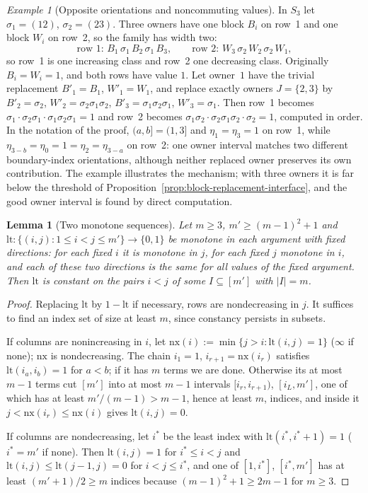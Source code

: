 \documentclass[11pt]{article}
\numberwithin{equation}{section}
\theoremstyle{plain}
\newtheorem{lemma}[theorem]{Lemma}
\theoremstyle{definition}
\theoremstyle{remark}
\newtheorem{example}[theorem]{Example}
\theoremstyle{plain}
\begin{document}
\begin{example}[Opposite orientations and noncommuting values]
\label{ex:nonabelian-reverse-owner}
In $S_3$ let $\sigma_1=(12)$, $\sigma_2=(23)$.  Three owners have one block $B_i$ on
row~1 and one block $W_i$ on row~2, so the family has width two:
\[
 \text{row 1: }B_1\,\sigma_1\,B_2\,\sigma_1\,B_3,\qquad
 \text{row 2: }W_3\,\sigma_2\,W_2\,\sigma_2\,W_1,
\]
so row~1 is one increasing class and row~2 one decreasing class.  Originally
$B_i=W_i=1$, and both rows have value $1$.  Let owner~$1$ have the
trivial replacement $B'_1=B_1$, $W'_1=W_1$, and replace exactly owners
$J=\{2,3\}$ by $B'_2=\sigma_2$, $W'_2=\sigma_2\sigma_1\sigma_2$, $B'_3=\sigma_1\sigma_2\sigma_1$,
$W'_3=\sigma_1$.  Then row~1 becomes
$\sigma_1\cdot\sigma_2\sigma_1\cdot\sigma_1\sigma_2\sigma_1=1$ and row~2 becomes
$\sigma_1\sigma_2\cdot\sigma_2\sigma_1\sigma_2\cdot\sigma_2=1$, computed in order.  In the notation
of the proof, $(a,b]=(1,3]$ and $\eta_1=\eta_3=1$ on row~1, while
$\eta_{3-b}=\eta_0=1=\eta_2=\eta_{3-a}$ on row~2: one owner interval matches
two different boundary-index orientations, although neither replaced owner
preserves its own contribution.  The example illustrates the mechanism; with
three owners it is far below the threshold of Proposition~\ref{prop:block-replacement-interface},
and the good owner interval is found by direct computation.
\end{example}

\begin{lemma}[Two monotone sequences]
\label{lem:two-sequence}
Let $m\ge3$, $m'\ge(m-1)^2+1$ and $\mathrm{lt}:\{(i,j):1\le i<j\le m'\}\to\{0,1\}$
be monotone in each argument with fixed directions: for each fixed $i$ it is
monotone in $j$, for each fixed $j$ monotone in $i$, and each of these two
directions is the same for all values of the fixed argument.  Then $\mathrm{lt}$ is
constant on the pairs $i<j$ of some $I\subseteq[m']$ with $|I|=m$.
\end{lemma}

\begin{proof}
Replacing $\mathrm{lt}$ by $1-\mathrm{lt}$ if necessary, rows are nondecreasing in $j$.
It suffices to find an index set of size at least $m$, since constancy persists in
subsets.

If columns are nonincreasing in $i$, let $\mathrm{nx}(i):=\min\{j>i:\mathrm{lt}(i,j)=1\}$ ($\infty$ if
none); $\mathrm{nx}$ is nondecreasing.  The chain $i_1=1$, $i_{r+1}=\mathrm{nx}(i_r)$ satisfies
$\mathrm{lt}(i_a,i_b)=1$ for $a<b$; if it has $m$ terms we are done.  Otherwise its at most
$m-1$ terms cut $[m']$ into at most $m-1$ intervals $[i_r,i_{r+1})$, $[i_L,m']$, one
of which has at least $m'/(m-1)>m-1$, hence at least $m$, indices, and inside it $j<\mathrm{nx}(i_r)\le \mathrm{nx}(i)$ gives
$\mathrm{lt}(i,j)=0$.

If columns are nondecreasing, let $i^\ast$ be the least index with
$\mathrm{lt}(i^\ast,i^\ast+1)=1$ ($i^\ast=m'$ if none).  Then $\mathrm{lt}(i,j)=1$ for $i^\ast\le i<j$
and $\mathrm{lt}(i,j)\le \mathrm{lt}(j-1,j)=0$ for $i<j\le i^\ast$, and one of $[1,i^\ast]$,
$[i^\ast,m']$ has at least $(m'+1)/2\ge m$ indices because $(m-1)^2+1\ge2m-1$ for
$m\ge3$.
\end{proof}
\end{document}

